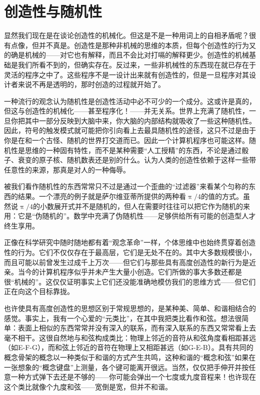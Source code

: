 \section{创造性与随机性}

显然我们现在是在谈论创造性的机械化。但这是不是一种用词上的自相矛盾呢？很有点像，但并不真是。创造性是那种非机械的思维的本质，但每个创造性的行为又的确是机械的——对它也有解释，而且不会比对打嗝的解释更少。创造性的机械基础是我们所看不到的，但确实存在。反过来，一些非机械性的东西现在就已存在于灵活的程序之中了。这些程序不是一设计出来就有创造性的，但是一旦程序对其设计者来说不再是透明的，那时创造的过程就开始了。

一种流行的观念认为随机性是创造性活动中必不可少的一个成分。这或许是真的，但这与创造性的机械化——甚至程序化！——并无关系。世界上充满了随机性，一旦你把其中一部分反映到大脑中来，你大脑的内部结构就吸收了一些这种随机性。因此，符号的触发模式就可能把你引向看上去最具随机性的途径，这只不过是由于你是在和一个古怪、随机的世界打交道而已。因此一个计算机程序也可能这样。随机性是思维的一种固有特性，而不是某种需要“人工授精”的东西，不论是通过骰子、衰变的原子核、随机数表还是别的什么。认为人类的创造性依赖于这样一些带任意性的来源，那真是对人的一种侮辱。

被我们看作随机性的东西常常只不过是通过一个歪曲的“过滤器”来看某个匀称的东西的结果。一个漂亮的例子就是萨尔维亚蒂所提供的两种看$\uppi/4$的值的方式。虽然说$\uppi/4$的小数展开式并不是随机的，但人在需要时往往可以把它作为随机的来用：它是“伪随机的”。数学中充满了伪随机性——足够供给所有可能的创造型人才终生享用。

正像在科学研究中随时随地都有着“观念革命”一样，个体思维中也始终贯穿着创造性的行为。它们不仅仅存在于最高层，它们是无处不在的。其中大多数规模很小，而且可能以前曾发生过成千上万次——但它们与那些具有高度创造性的新行为是近亲。当今的计算机程序似乎并未产生大量小创造。它们所做的事大多数还都是很“机械的”。这仅仅证明事实上它们还没能准确地模仿我们的思维方式——但它们正在向这个目标靠拢。

也许使具有高度创造性的思想区别于常规思想的，是某种美、简单、和谐相结合的感觉。事实上，我有一个心爱的“元类比”，在其中我把类比看作和弦。想法很简单：表面上相似的东西常常并没有深入的联系，而有深入联系的东西又常常看上去毫不相干。这很自然地与和弦构成类比：物理上邻近的音符从和弦角度看相距甚远（如E-F-G），而和弦上邻近的音符在物理上又相距甚远（如G-E-B）。具有共同的概念骨架的概念以一种类似于和谐的方式产生共鸣，这种和谐的“概念和弦”如果在一张想象的“概念键盘”上测量，各个键可能离开很远。当然，仅仅把手伸开并按任意一种方式弹下去还是不够的——你可能会弹出一个七度或九度音程来！也许现在这个类比就像个九度和弦——宽倒是宽，但并不和谐。

